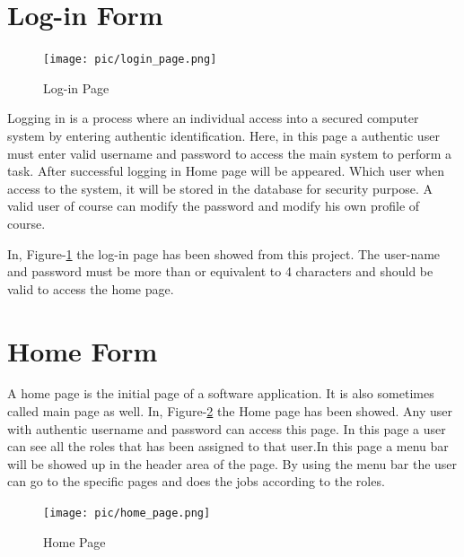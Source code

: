 \documentclass[12pt]{report} %
\begin{document}
\section{Log-in Form}

\begin{figure}[h]
	\begin{center}
	\texttt{[image: pic/login\_page.png]}
	\end{center}
	\caption{Log-in Page}
	\label{fig:login_page}
\end{figure}


Logging in is a process where an individual access into a secured computer system by entering authentic identification. Here, in this page a authentic user must enter valid username and password to access the main system to perform a task. After successful logging in Home page will be appeared. Which user when access to the system, it will be stored in the database for security purpose. A valid user of course can modify the password and modify his own profile of course.


In, Figure-\ref{fig:login_page} the log-in page has been showed from this project. The user-name and password must be more than or equivalent to 4 characters and should be valid to access the home page. 





\section{Home Form}

A home page  is the initial page of a software application. It is also sometimes called main page as well. In, Figure-\ref{fig:home_page} the Home page has been showed. Any user with authentic username and password can access this page. In this page a user can see all the roles that has been assigned to that user.In this page a menu bar will be showed up in the header area of the page. By using the menu bar the user can go to the specific pages and does the jobs according to the roles.

\clearpage



\begin{figure}[h]
		\begin{center}
			\texttt{[image: pic/home\_page.png]}
		\end{center}
	\caption{Home Page}
	\label{fig:home_page}
\end{figure}
\end{document}
